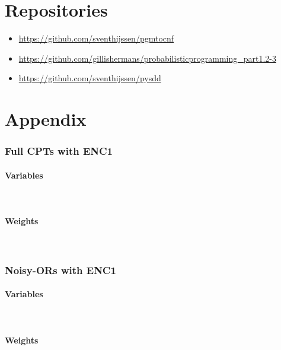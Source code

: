 \documentclass{article}
\begin{document}
\newpage


\section*{Repositories}
\begin{itemize}
	\item \href{https://github.com/sventhijssen/pgmtocnf}{https://github.com/sventhijssen/pgmtocnf}
	\item \href{https://github.com/gillishermans/probabilisticprogramming_part1.2-3}{https://github.com/gillishermans/probabilisticprogramming\_part1.2-3}
	\item \href{https://github.com/sventhijssen/pysdd}{https://github.com/sventhijssen/pysdd}
\end{itemize}




\newpage

\section*{Appendix}
\label{appendix}
\subsubsection*{Full CPTs with ENC1}
\paragraph{Variables}\mbox{}\\

\newpage
\paragraph{Weights}\mbox{}\\


\newpage

\subsubsection*{Noisy-ORs with ENC1}
\paragraph{Variables}\mbox{}\\

\newpage
\paragraph{Weights}\mbox{}\\

\end{document}
